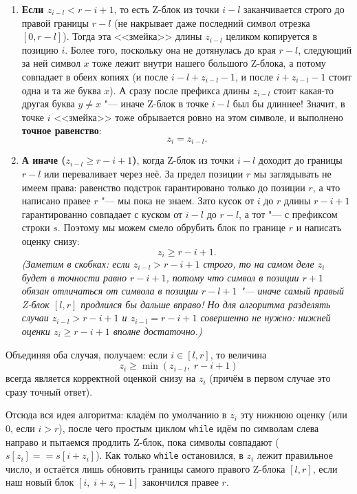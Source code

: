 \begin{enumerate}
    \item \textbf{Если $z_{i-l} < r - i + 1$}, то есть Z-блок из точки $i - l$ заканчивается строго до правой границы $r - l$ (не накрывает даже последний символ отрезка $[0, r - l]$). Тогда эта <<змейка>> длины $z_{i-l}$ целиком копируется в позицию $i$. Более того, поскольку она не дотянулась до края $r - l$, следующий за ней символ $x$ тоже лежит внутри нашего большого Z-блока, а потому совпадает в обеих копиях (и после $i - l + z_{i-l} - 1$, и после $i + z_{i-l} - 1$ стоит одна и та же буква $x$). А сразу после префикса длины $z_{i-l}$ стоит какая-то другая буква $y \ne x$ "--- иначе Z-блок в точке $i - l$ был бы длиннее! Значит, в точке $i$ <<змейка>> тоже обрывается ровно на этом символе, и выполнено \textbf{точное равенство}:
    \[
        z_i = z_{i-l}.
    \]
    \item \textbf{А иначе ($z_{i-l} \ge r - i + 1$)}, когда Z-блок из точки $i - l$ доходит до границы $r - l$ или переваливает через неё. За предел позиции $r$ мы заглядывать не имеем права: равенство подстрок гарантировано только до позиции $r$, а что написано правее $r$ "--- мы пока не знаем. Зато кусок от $i$ до $r$ длины $r - i + 1$ гарантированно совпадает с куском от $i - l$ до $r - l$, а тот "--- с префиксом строки $s$. Поэтому мы можем смело обрубить блок по границе $r$ и написать оценку снизу:
    \[
        z_i \ge r - i + 1.
    \]
    \textit{(Заметим в скобках: если $z_{i-l} > r - i + 1$ строго, то на самом деле $z_i$ будет в точности равно $r - i + 1$, потому что символ в позиции $r + 1$ обязан отличаться от символа в позиции $r - l + 1$ "--- иначе самый правый Z-блок $[l, r]$ продлился бы дальше вправо! Но для алгоритма разделять случаи $z_{i-l} > r - i + 1$ и $z_{i-l} = r - i + 1$ совершенно не нужно: нижней оценки $z_i \ge r - i + 1$ вполне достаточно.)}
\end{enumerate}

Объединяя оба случая, получаем: если $i \in [l, r]$, то величина
\begin{equation}\label{eq:z_lower_bound}
    z_i \ge \min(z_{i-l},\; r - i + 1)
\end{equation}
всегда является корректной оценкой снизу на $z_i$ (причём в первом случае это сразу точный ответ).

Отсюда вся идея алгоритма: кладём по умолчанию в $z_i$ эту нижнюю оценку (или $0$, если $i > r$), после чего простым циклом \texttt{while} идём по символам слева направо и пытаемся продлить Z-блок, пока символы совпадают ($s[z_i] == s[i + z_i]$). Как только \texttt{while} остановился, в $z_i$ лежит правильное число, и остаётся лишь обновить границы самого правого Z-блока $[l, r]$, если наш новый блок $[i,\; i + z_i - 1]$ закончился правее $r$.

